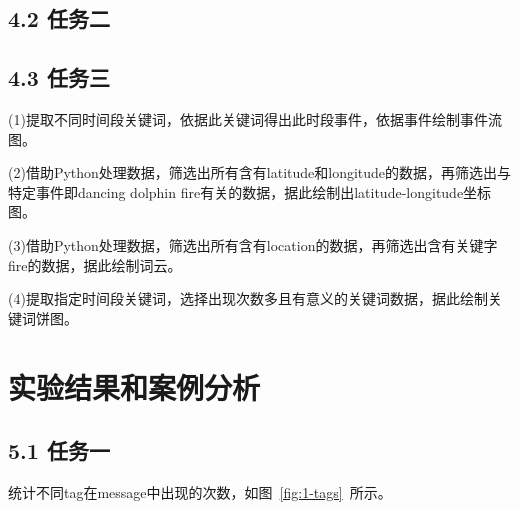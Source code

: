 \documentclass[a4paper]{article}
\begin{document}
\subsection*{ 4.2 任务二}
\subsection*{ 4.3 任务三}
(1)提取不同时间段关键词，依据此关键词得出此时段事件，依据事件绘制事件流图。

(2)借助Python处理数据，筛选出所有含有latitude和longitude的数据，再筛选出与特定事件即dancing dolphin fire有关的数据，据此绘制出latitude-longitude坐标图。

(3)借助Python处理数据，筛选出所有含有location的数据，再筛选出含有关键字fire的数据，据此绘制词云。

(4)提取指定时间段关键词，选择出现次数多且有意义的关键词数据，据此绘制关键词饼图。

\section{实验结果和案例分析}\label{sub:ptxeva}
\subsection*{ 5.1 任务一}

统计不同tag在message中出现的次数，如图~\ref{fig:1-tags}~所示。
\end{document}

